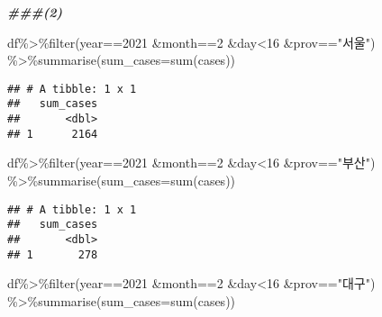 \documentclass[
]{article}
\newenvironment{Shaded}{\begin{snugshade}}{\end{snugshade}}
\newcommand{\AttributeTok}[1]{\textcolor[rgb]{0.77,0.63,0.00}{#1}}
\newcommand{\DecValTok}[1]{\textcolor[rgb]{0.00,0.00,0.81}{#1}}
\newcommand{\DocumentationTok}[1]{\textcolor[rgb]{0.56,0.35,0.01}{\textbf{\textit{#1}}}}
\newcommand{\FunctionTok}[1]{\textcolor[rgb]{0.00,0.00,0.00}{#1}}
\newcommand{\NormalTok}[1]{#1}
\newcommand{\SpecialCharTok}[1]{\textcolor[rgb]{0.00,0.00,0.00}{#1}}
\newcommand{\StringTok}[1]{\textcolor[rgb]{0.31,0.60,0.02}{#1}}
\begin{document}
\begin{Shaded}
\begin{Highlighting}[]
\DocumentationTok{\#\#\#(2)}

\NormalTok{df}\SpecialCharTok{\%\textgreater{}\%}\FunctionTok{filter}\NormalTok{(year}\SpecialCharTok{==}\DecValTok{2021} \SpecialCharTok{\&}\NormalTok{month}\SpecialCharTok{==}\DecValTok{2} \SpecialCharTok{\&}\NormalTok{day}\SpecialCharTok{\textless{}}\DecValTok{16} \SpecialCharTok{\&}\NormalTok{prov}\SpecialCharTok{==}\StringTok{"서울"}\NormalTok{) }\SpecialCharTok{\%\textgreater{}\%}\FunctionTok{summarise}\NormalTok{(}\AttributeTok{sum\_cases=}\FunctionTok{sum}\NormalTok{(cases))}
\end{Highlighting}
\end{Shaded}

\begin{verbatim}
## # A tibble: 1 x 1
##   sum_cases
##       <dbl>
## 1      2164
\end{verbatim}

\begin{Shaded}
\begin{Highlighting}[]
\NormalTok{df}\SpecialCharTok{\%\textgreater{}\%}\FunctionTok{filter}\NormalTok{(year}\SpecialCharTok{==}\DecValTok{2021} \SpecialCharTok{\&}\NormalTok{month}\SpecialCharTok{==}\DecValTok{2} \SpecialCharTok{\&}\NormalTok{day}\SpecialCharTok{\textless{}}\DecValTok{16} \SpecialCharTok{\&}\NormalTok{prov}\SpecialCharTok{==}\StringTok{"부산"}\NormalTok{) }\SpecialCharTok{\%\textgreater{}\%}\FunctionTok{summarise}\NormalTok{(}\AttributeTok{sum\_cases=}\FunctionTok{sum}\NormalTok{(cases))}
\end{Highlighting}
\end{Shaded}

\begin{verbatim}
## # A tibble: 1 x 1
##   sum_cases
##       <dbl>
## 1       278
\end{verbatim}

\begin{Shaded}
\begin{Highlighting}[]
\NormalTok{df}\SpecialCharTok{\%\textgreater{}\%}\FunctionTok{filter}\NormalTok{(year}\SpecialCharTok{==}\DecValTok{2021} \SpecialCharTok{\&}\NormalTok{month}\SpecialCharTok{==}\DecValTok{2} \SpecialCharTok{\&}\NormalTok{day}\SpecialCharTok{\textless{}}\DecValTok{16} \SpecialCharTok{\&}\NormalTok{prov}\SpecialCharTok{==}\StringTok{"대구"}\NormalTok{) }\SpecialCharTok{\%\textgreater{}\%}\FunctionTok{summarise}\NormalTok{(}\AttributeTok{sum\_cases=}\FunctionTok{sum}\NormalTok{(cases))}
\end{Highlighting}
\end{Shaded}
\end{document}
